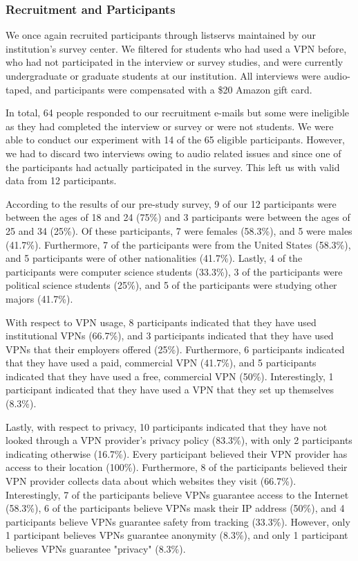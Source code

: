\subsubsection{Recruitment and Participants} 

We once again recruited participants through listservs maintained by our
institution's survey center.  We filtered for students who had used a VPN
before, who had not participated in the interview or survey studies, and were
currently undergraduate or graduate students at our institution.  All
interviews were audio-taped, and participants were compensated with a \$20
Amazon gift card.

In total, 64 people responded to our recruitment e-mails but some were
ineligible as they had completed the interview or survey or were not students.
We were able to conduct our experiment with 14 of the 65 eligible
participants.  However, we had to discard two interviews owing to audio
related issues and since one of the participants had actually participated in
the survey.  This left us with valid data from 12 participants.

According to the results of our pre-study survey, 9 of our 12 participants were between the ages of 18 and 24 (75\%) and 3 participants were between the ages of 25 and 34 (25\%).
Of these participants, 7 were females (58.3\%), and 5 were males (41.7\%).
Furthermore, 7 of the participants were from the United States (58.3\%), and 5 participants were of other nationalities (41.7\%). 
Lastly, 4 of the participants were computer science students (33.3\%), 3 of the participants were political science students (25\%), and 5 of the participants were studying other majors (41.7\%).

With respect to VPN usage, 8 participants indicated that they have used institutional VPNs (66.7\%), and 3 participants indicated that they have used VPNs that their employers offered (25\%).
Furthermore, 6 participants indicated that they have used a paid, commercial VPN (41.7\%), and 5 participants indicated that they have used a free, commercial VPN (50\%).
Interestingly, 1 participant indicated that they have used a VPN that they set up themselves (8.3\%).

Lastly, with respect to privacy, 10 participants indicated that they have not looked through a VPN provider's privacy policy (83.3\%), with only 2 participants indicating otherwise (16.7\%).
Every participant believed their VPN provider has access to their location (100\%).
Furthermore, 8 of the participants believed their VPN provider collects data about which websites they visit (66.7\%).
Interestingly, 7 of the participants believe VPNs guarantee access to the Internet (58.3\%), 6 of the participants believe VPNs mask their IP address (50\%), and 4 participants believe VPNs guarantee safety from tracking (33.3\%).
However, only 1 participant believes VPNs guarantee anonymity (8.3\%), and only 1 participant believes VPNs guarantee "privacy" (8.3\%).

